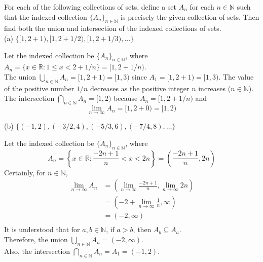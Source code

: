 \documentclass[12pt]{article}
\newcommand{\N}{\mathbb{N}}
\newcommand{\R}{\mathbb{R}}
\newenvironment{problem}[2][Problem]{\begin{trivlist}
		\item[\hskip \labelsep {\bfseries #1}\hskip \labelsep {\bfseries #2.}]}{\end{trivlist}}
\newenvironment{solution}[2][Solution]{\begin{trivlist}
		\item[\hskip \labelsep {\bfseries #1}\hskip \labelsep {\bfseries #2.}]}{\end{trivlist}}
\begin{document}
	\begin{problem}{42}
		For each of the following collections of sets, define a set $A_{n}$ for each $n \in \N$ such that the indexed collection $\{A_{n}\}_{n\in \N}$ is precisely the given collection of sets. Then find both the union and intersection of the indexed collections of sets.\\
		
		(a) $\{[1,2+1), [1,2+1/2), [1,2+1/3),\ldots\}$
		\begin{solution}{a}
			Let the indexed collection be $\{A_{n}\}_{n\in \N}$, where $A_{n}=\{x\in \R: 1\leq x < 2+ 1/n\} = [1,2+1/n)$.\\
			The union $\bigcup_{n\in \N} A_{n}= [1,2+1) = [1,3)$ since $A_{1} = [1,2+1) = [1,3)$. The value of the positive number $1/n$ decreases as the positive integer $n$ increases ($n\in \N$).\\
			The intersection $\bigcap_{n\in \N} A_{n} = [1,2)$ because $A_{n}=[1,2+1/n)$ and
			\begin{equation*}
				\lim_{n\to \infty} A_{n} = [1,2+0) = [1,2)
			\end{equation*}
		\end{solution}
		(b) $\{(-1,2),(-3/2,4),(-5/3,6),(-7/4,8),\ldots\}$
		\begin{solution}{b}
			Let the indexed collection be $\{A_{n}\}_{n\in \N}$, where 
			\begin{equation*}
				A_{n} = \left\{x\in \R: \frac{-2n+1}{n} <x< 2n\right\} = \left(\frac{-2n+1}{n},2n\right)
			\end{equation*}
			Certainly, for $n \in \N$, 
			\begin{align*}
			\lim_{n\to \infty}	A_{n} &= \left(\lim_{n\to \infty}\frac{-2n+1}{n},\lim_{n\to \infty}2n\right)\\
					  &= \left(-2+\lim_{n\to \infty}\frac{1}{n},\infty\right)\\
					  &= \left(-2,\infty\right)\\
			\end{align*}
		It is understood that for $a,b \in \N$, if $a > b$, then $A_{b} \subseteq A_{a}$.\\
		Therefore, the union $\bigcup_{n\in \N} A_{n} = (-2,\infty)$.\\
		Also, the intersection $\bigcap_{n\in \N} A_{n} = A_{1} = (-1,2)$.
		\end{solution}
	\end{problem}
\end{document}
